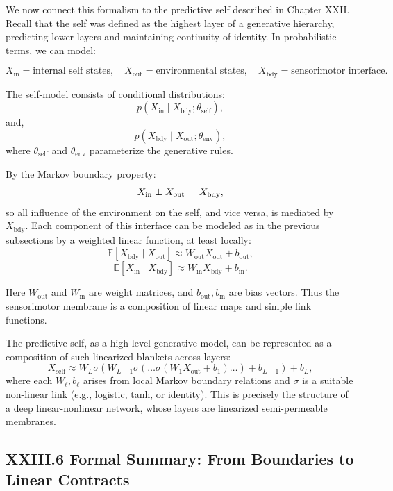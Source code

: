 \documentclass[11pt,letterpaper]{article}
\begin{document}
We now connect this formalism to the predictive self described in Chapter XXII. Recall that the self was defined as the highest layer of a generative hierarchy, predicting lower layers and maintaining continuity of identity. In probabilistic terms, we can model:

\[
X_{\text{in}} = \text{internal self states}, \quad
X_{\text{out}} = \text{environmental states}, \quad
X_{\text{bdy}} = \text{sensorimotor interface}.
\]

The self-model consists of conditional distributions:
\[
p(X_{\text{in}} \mid X_{\text{bdy}}; \theta_{\text{self}}),
\]
and,
\[
p(X_{\text{bdy}} \mid X_{\text{out}}; \theta_{\text{env}}),
\]
where $\theta_{\text{self}}$ and $\theta_{\text{env}}$ parameterize the generative rules.

By the Markov boundary property:
\[
X_{\text{in}} \perp X_{\text{out}} \;\bigm|\; X_{\text{bdy}},
\]
so all influence of the environment on the self, and vice versa, is mediated by $X_{\text{bdy}}$. Each component of this interface can be modeled as in the previous subsections by a weighted linear function, at least locally:
\[
\mathbb{E}[X_{\text{bdy}} \mid X_{\text{out}}] \approx W_{\text{out}} X_{\text{out}} + b_{\text{out}},
\]
\[
\mathbb{E}[X_{\text{in}} \mid X_{\text{bdy}}] \approx W_{\text{in}} X_{\text{bdy}} + b_{\text{in}}.
\]

Here $W_{\text{out}}$ and $W_{\text{in}}$ are weight matrices, and $b_{\text{out}}, b_{\text{in}}$ are bias vectors. Thus the sensorimotor membrane is a composition of linear maps and simple link functions.

The predictive self, as a high-level generative model, can be represented as a composition of such linearized blankets across layers:
\[
X_{\text{self}} \approx W_L \sigma(W_{L-1} \sigma(\dots \sigma(W_1 X_{\text{out}} + b_1) \dots ) + b_{L-1}) + b_L,
\]
where each $W_\ell, b_\ell$ arises from local Markov boundary relations and $\sigma$ is a suitable non-linear link (e.g., logistic, tanh, or identity). This is precisely the structure of a deep linear-nonlinear network, whose layers are linearized semi-permeable membranes.

\subsection{XXIII.6 Formal Summary: From Boundaries to Linear Contracts}
\end{document}
